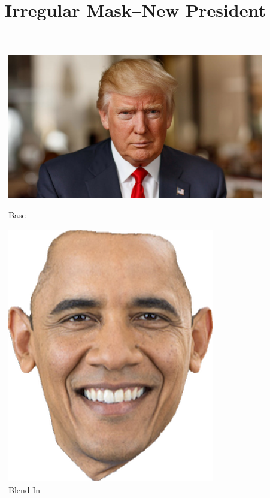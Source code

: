 \documentclass{article}
\begin{document}
\title{Irregular Mask–New President}
\begin{figure}[!htb]
    \includegraphics[width=\linewidth]{trump.jpg}
    \caption{Base}
\endminipage
{}
    \includegraphics[width=\linewidth]{obamaface.png}
    \caption{Blend In}
\endminipage
\end{figure}
\end{document}

